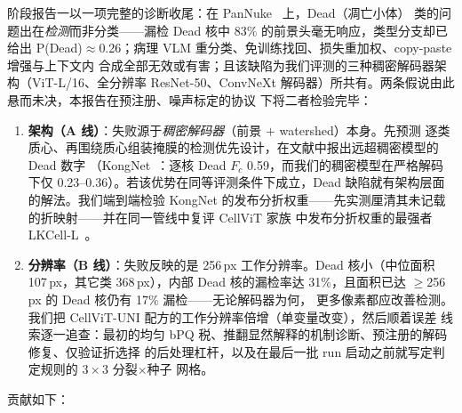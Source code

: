 \documentclass[11pt]{article}
\begin{document}
阶段报告一以一项完整的诊断收尾：在 PanNuke~\cite{gamper2019pannuke} 上，Dead（凋亡小体）
类的问题出在\emph{检测}而非分类——漏检 Dead 核中 83\% 的前景头毫无响应，类型分支却已给出
P(Dead)$\approx$0.26；病理 VLM 重分类、免训练找回、损失重加权、copy-paste 增强与上下文内
合成全部无效或有害；且该缺陷为我们评测的三种稠密解码器架构（ViT-L/16、全分辨率
ResNet-50、ConvNeXt 解码器）所共有。两条假说由此悬而未决，本报告在预注册、噪声标定的协议
下将二者检验完毕：

\begin{enumerate}
\item \textbf{架构（A 线）}：失败源于\emph{稠密解码器}（前景 $+$ watershed）本身。先预测
逐类质心、再围绕质心组装掩膜的检测优先设计，在文献中报出远超稠密模型的 Dead 数字
（KongNet~\cite{lv2025kongnet}：逐核 Dead $F_c$ 0.59，而我们的稠密模型在严格解码下仅
0.23--0.36）。若该优势在同等评测条件下成立，Dead 缺陷就有架构层面的解法。我们端到端检验
KongNet 的发布分折权重——先实测厘清其未记载的折映射——并在同一管线中复评 CellViT 家族
中发布分折权重的最强者 LKCell-L~\cite{cui2024lkcell}。
\item \textbf{分辨率（B 线）}：失败反映的是 256\,px 工作分辨率。Dead 核小（中位面积
107\,px，其它类 368\,px），内部 Dead 核的漏检率达 31\%，且面积已达 $\geq$256\,px 的 Dead
核仍有 17\% 漏检——无论解码器为何，
更多像素都应改善检测。我们把 CellViT-UNI 配方的工作分辨率倍增（单变量改变），然后顺着误差
线索逐一追查：最初的均匀 bPQ 税、推翻显然解释的机制诊断、预注册的解码修复、仅验证折选择
的后处理杠杆，以及在最后一批 run 启动之前就写定判定规则的 $3{\times}3$ 分裂$\times$种子
网格。
\end{enumerate}

贡献如下：
\end{document}
